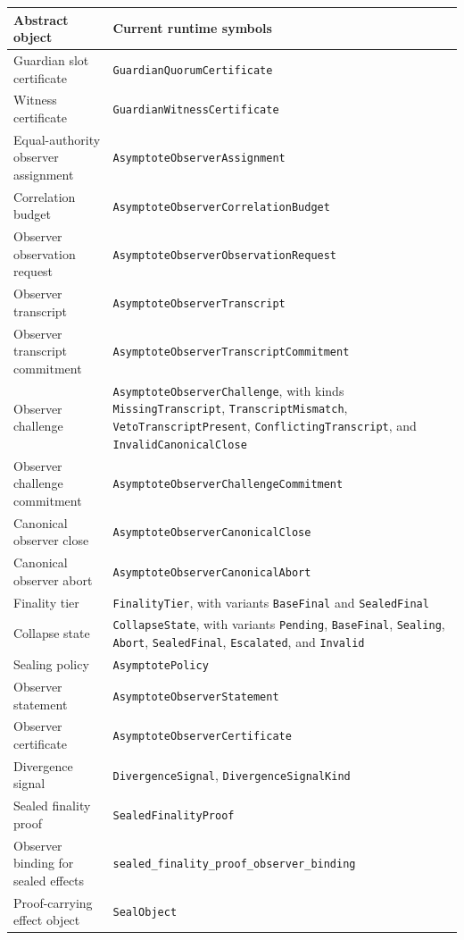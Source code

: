 \documentclass[11pt]{article}
\newcommand{\code}[1]{\texttt{#1}}
\begin{document}
\begin{center}
\small
\begin{tabularx}{\textwidth}{>{\raggedright\arraybackslash}p{} X}
\toprule
\textbf{Abstract object} & \textbf{Current runtime symbols} \\
\midrule
Guardian slot certificate & \code{GuardianQuorumCertificate} \\
Witness certificate & \code{GuardianWitnessCertificate} \\
Equal-authority observer assignment & \code{AsymptoteObserverAssignment} \\
Correlation budget & \code{AsymptoteObserverCorrelationBudget} \\
Observer observation request & \code{AsymptoteObserverObservationRequest} \\
Observer transcript & \code{AsymptoteObserverTranscript} \\
Observer transcript commitment & \code{AsymptoteObserverTranscriptCommitment} \\
Observer challenge & \code{AsymptoteObserverChallenge}, with kinds \code{MissingTranscript}, \code{TranscriptMismatch}, \code{VetoTranscriptPresent}, \code{ConflictingTranscript}, and \code{InvalidCanonicalClose} \\
Observer challenge commitment & \code{AsymptoteObserverChallengeCommitment} \\
Canonical observer close & \code{AsymptoteObserverCanonicalClose} \\
Canonical observer abort & \code{AsymptoteObserverCanonicalAbort} \\
Finality tier & \code{FinalityTier}, with variants \code{BaseFinal} and \code{SealedFinal} \\
Collapse state & \code{CollapseState}, with variants \code{Pending}, \code{BaseFinal}, \code{Sealing}, \code{Abort}, \code{SealedFinal}, \code{Escalated}, and \code{Invalid} \\
Sealing policy & \code{AsymptotePolicy} \\
Observer statement & \code{AsymptoteObserverStatement} \\
Observer certificate & \code{AsymptoteObserverCertificate} \\
Divergence signal & \code{DivergenceSignal}, \code{DivergenceSignalKind} \\
Sealed finality proof & \code{SealedFinalityProof} \\
Observer binding for sealed effects & \code{sealed\_finality\_proof\_observer\_binding} \\
Proof-carrying effect object & \code{SealObject} \\
\bottomrule
\end{tabularx}
\end{center}
\end{document}

